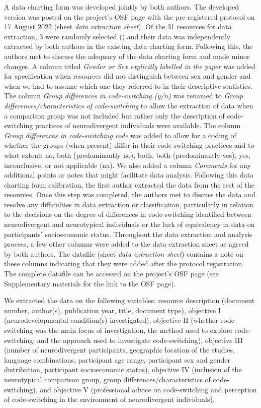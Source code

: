 \documentclass[output=paper]{langscibook}
\begin{document}
A data charting form was developed jointly by both authors. The developed version was posted on the project's OSF page with the pre-registered protocol on 17  {August 2022} (sheet \textit{data extraction sheet}). Of the 31 resources for data extraction, 3 were randomly selected (\citealt{Gutiérrez-ClellenEtAl2009, Iluz-CohenWalters2012, SoesmanEtAl2022}) and their data was independently extracted by both authors in the existing data charting form. Following this, the authors met to discuss the adequacy of the data charting form and made minor changes. A column titled \textit{Gender or Sex explicitly labelled in the paper} was added for specification when resources did not distinguish between sex and gender and when we had to assume which one they referred to in their descriptive statistics. The column \textit{Group differences in code-switching (y/n)} was renamed to \textit{Group differences/characteristics of code-switching} to allow the extraction of data when a comparison group was not included but rather only the description of code-switching practices of neurodivergent individuals were available. The column \textit{Group differences in code-switching code} was added to allow for a coding of whether the groups (when present) differ in their code-switching practices and to what extent: no, both (predominantly no), both, both (predominantly yes), yes, inconclusive, or not applicable (na). We also added a column \textit{Comments} for any additional points or notes that might facilitate data analysis. Following this data charting form calibration, the first author extracted the data from the rest of the resources. Once this step was completed, the authors met to discuss the data and resolve any difficulties in data extraction or classification, particularly in relation to the decisions on the degree of differences in code-switching identified between neurodivergent and neurotypical individuals or the lack of equivalency in data on participants’ socioeconomic status. Throughout the data extraction and analysis process, a few other columns were added to the data extraction sheet as agreed by both authors. The datafile (sheet \textit{data extraction sheet}) contains a note on these columns indicating that they were added after the protocol registration. The complete datafile can be accessed on the project's OSF page (see Supplementary materials for the link to the OSF page).

We extracted the data on the following variables: resource description (document number, author(s), publication year, title, document type), objective I (neurodevelopmental condition(s) investigated), objective II (whether code-switching was the main focus of investigation, the method used to explore code-switching, and the approach used to investigate code-switching), objective III (number of neurodivergent participants, geographic location of the studies, language combinations, participant age range, participant sex and gender distribution, participant socioeconomic status), objective IV (inclusion of the neurotypical comparison group, group differences/characteristics of code-switching), and objective V (professional advice on code-switching and perception of code-switching in the environment of neurodivergent individuals).
\end{document}
